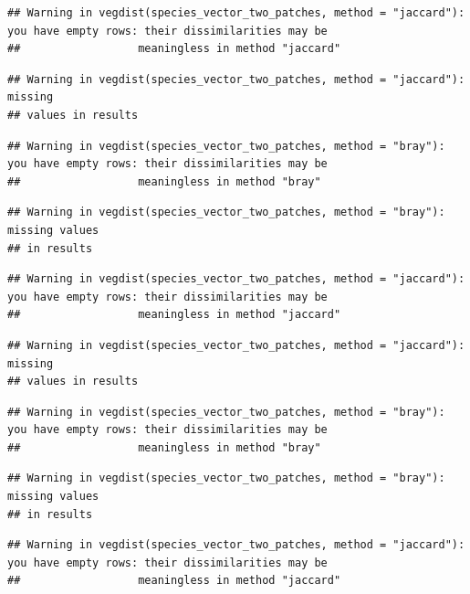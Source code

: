 \documentclass[
]{article}
\begin{document}
\begin{verbatim}
## Warning in vegdist(species_vector_two_patches, method = "jaccard"): you have empty rows: their dissimilarities may be
##                  meaningless in method "jaccard"
\end{verbatim}

\begin{verbatim}
## Warning in vegdist(species_vector_two_patches, method = "jaccard"): missing
## values in results
\end{verbatim}

\begin{verbatim}
## Warning in vegdist(species_vector_two_patches, method = "bray"): you have empty rows: their dissimilarities may be
##                  meaningless in method "bray"
\end{verbatim}

\begin{verbatim}
## Warning in vegdist(species_vector_two_patches, method = "bray"): missing values
## in results
\end{verbatim}

\begin{verbatim}
## Warning in vegdist(species_vector_two_patches, method = "jaccard"): you have empty rows: their dissimilarities may be
##                  meaningless in method "jaccard"
\end{verbatim}

\begin{verbatim}
## Warning in vegdist(species_vector_two_patches, method = "jaccard"): missing
## values in results
\end{verbatim}

\begin{verbatim}
## Warning in vegdist(species_vector_two_patches, method = "bray"): you have empty rows: their dissimilarities may be
##                  meaningless in method "bray"
\end{verbatim}

\begin{verbatim}
## Warning in vegdist(species_vector_two_patches, method = "bray"): missing values
## in results
\end{verbatim}

\begin{verbatim}
## Warning in vegdist(species_vector_two_patches, method = "jaccard"): you have empty rows: their dissimilarities may be
##                  meaningless in method "jaccard"
\end{verbatim}
\end{document}
